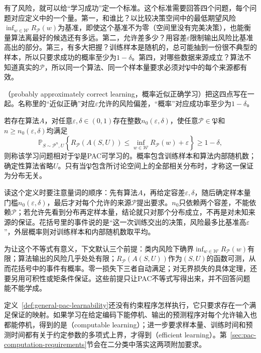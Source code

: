 有了风险，就可以给“学习成功”定一个标准。这个标准需要回答四个问题，每个问题对应定义中的一个量。第一，和谁比？以比较决策空间中的最低期望风险$\inf_{w\in\mathcal W}R_{\mathcal P}(w)$为基准，即使这个基准不为零（空间里没有完美决策），也能衡量算法离最好的候选还有多远。第二，允许差多少？用容差$\varepsilon$限制输出风险比基准高出的部分。第三，有多大把握？训练样本是随机的，总可能抽到一份很不典型的样本，所以只要求成功的概率至少为$1-\delta$。第四，对哪些数据来源成立？算法不知道真实的$\mathcal P$，所以同一个算法、同一个样本量要求必须对$\mathfrak P$中的每个来源都有效。

（probably approximately correct learning，概率近似正确学习）把这四点写在一起。名称里的“近似正确”对应$\varepsilon$允许的风险偏差，“概率”对应成功率至少为$1-\delta$。

\begin{definition}[相对于分布族的PAC可学习性]
\label{def:general-pac-learnability}
若存在算法$A$，对任意$\varepsilon,\delta\in(0,1)$存在整数$n_0(\varepsilon,\delta)$，使任意$\mathcal P\in\mathfrak P$和$n\geq n_0(\varepsilon,\delta)$均满足
\[
 \mathbb P_{S\sim\mathcal P^n,U}\!\left\{
 R_{\mathcal P}(A(S,U))\leq
 \inf_{w\in\mathcal W}R_{\mathcal P}(w)+\varepsilon
 \right\}\geq1-\delta,
\]
则称该学习问题相对于$\mathfrak P$是PAC可学习的。概率包含训练样本和算法内部随机数；确定性算法省略$U$。只有当$\mathfrak P$包含所讨论空间上的全部相关分布时，才称这一保证为分布无关。
\end{definition}

读这个定义时要注意量词的顺序：先有算法$A$，再给定容差$\varepsilon,\delta$，随后确定样本量门槛$n_0(\varepsilon,\delta)$，最后才对每个允许的来源$\mathcal P$提出要求。$n_0$只依赖两个容差，不能依赖$\mathcal P$；若允许先看到分布再定样本量，结论就只对那个分布成立，不再是对未知来源的保证。花括号里的事件说的是“这一次训练交出的决策，风险最多比基准高$\varepsilon$”，外层概率则对训练样本和内部随机数取平均。

为让这个不等式有意义，下文默认三个前提：类内风险下确界$\inf_{w\in\mathcal W}R_{\mathcal P}(w)$有限；算法输出的风险几乎处处有限；$R_{\mathcal P}(A(S,U))$作为$(S,U)$的函数可测，从而花括号中的事件有概率。零一损失下三者自动满足；对无界损失的具体定理，还要另用可积性或矩条件保证。这些前提只让PAC不等式写得出来，并不回答问题能不能学成。

定义~\ref{def:general-pac-learnability}还没有约束程序怎样执行，它只要求存在一个满足保证的映射。如果学习在给定编码下能停机、输出的预测程序对每个允许输入也都能停机，得到的是（computable learning）；进一步要求样本量、训练时间和预测时间都有关于约定参数的多项式上界，才得到（efficient learning）。第~\ref{sec:pac-computation-requirements}节会在二分类中落实这两项附加要求。

